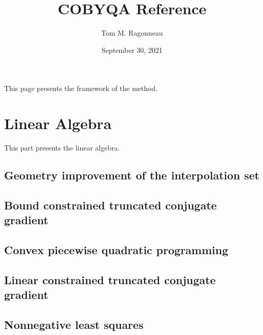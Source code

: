 \documentclass[letterpaper,10pt,english]{sphinxmanual}
\title{COBYQA Reference}
\date{September 30, 2021}
\author{Tom M. Ragonneau}
\begin{document}
\pagestyle{empty}
\sphinxmaketitle
\pagestyle{plain}
\sphinxtableofcontents
\pagestyle{normal}
\label{\detokenize{algo/index::doc}}


\sphinxAtStartPar
This page presents the framework of the method.


\chapter{Linear Algebra}
\label{\detokenize{algo/linalg:linear-algebra}}\label{\detokenize{algo/linalg:linalg}}\label{\detokenize{algo/linalg::doc}}
\sphinxAtStartPar
This part presents the linear algebra.


\section{Geometry improvement of the interpolation set}
\label{\detokenize{algo/linalg.altmov:geometry-improvement-of-the-interpolation-set}}\label{\detokenize{algo/linalg.altmov:linalg-altmov}}\label{\detokenize{algo/linalg.altmov::doc}}

\section{Bound constrained truncated conjugate gradient}
\label{\detokenize{algo/linalg.bvtcg:bound-constrained-truncated-conjugate-gradient}}\label{\detokenize{algo/linalg.bvtcg:linalg-bvtcg}}\label{\detokenize{algo/linalg.bvtcg::doc}}

\section{Convex piecewise quadratic programming}
\label{\detokenize{algo/linalg.cpqp:convex-piecewise-quadratic-programming}}\label{\detokenize{algo/linalg.cpqp:linalg-cpqp}}\label{\detokenize{algo/linalg.cpqp::doc}}

\section{Linear constrained truncated conjugate gradient}
\label{\detokenize{algo/linalg.lctcg:linear-constrained-truncated-conjugate-gradient}}\label{\detokenize{algo/linalg.lctcg:linalg-lctcg}}\label{\detokenize{algo/linalg.lctcg::doc}}

\section{Nonnegative least squares}
\label{\detokenize{algo/linalg.nnls:nonnegative-least-squares}}\label{\detokenize{algo/linalg.nnls:linalg-nnls}}\label{\detokenize{algo/linalg.nnls::doc}}


\renewcommand{\indexname}{Index}
\printindex
\end{document}

